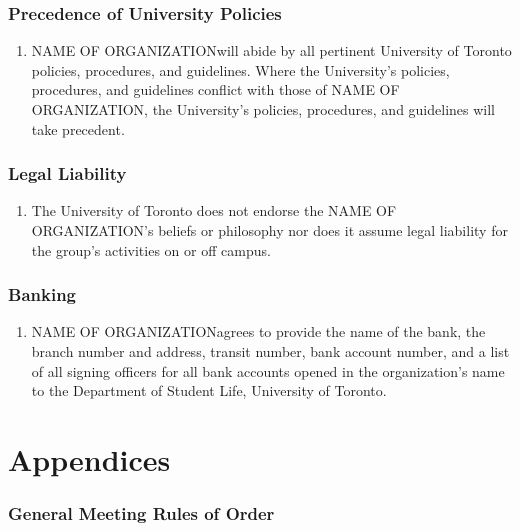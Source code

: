 \documentclass[12pt]{article}
\newcommand{\orgname}{NAME OF ORGANIZATION\space}
\begin{document}
\section{Precedence of University Policies}
\begin{enumerate}[{15}.1]
    \item \orgname will abide by all pertinent University of Toronto policies, procedures, and guidelines. Where the University’s policies, procedures, and guidelines conflict with those of \orgname, the University’s policies, procedures, and guidelines will take precedent.
\end{enumerate}


\section{Legal Liability}
\begin{enumerate}[{16}.1]
    \item The University of Toronto does not endorse the \orgname’s beliefs or philosophy nor does it assume legal liability for the group’s activities on or off campus.\end{enumerate}


\section{Banking}
\begin{enumerate}[{17}.1]
    \item \orgname agrees to provide the name of the bank, the branch number and address, transit number, bank account number, and a list of all signing officers for all bank accounts opened in the organization’s name to the Department of Student Life, University of Toronto.
\end{enumerate}



\pagebreak[4]
\appendix
\part{Appendices}

\section{General Meeting Rules of Order}


\end{document}
